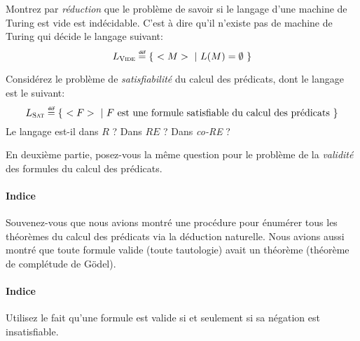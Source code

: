 \documentclass[12pt,french,a4paper]{article}
\newcommand\eqdef{\mathrel{\overset{\makebox[0pt]{\mbox{\normalfont\tiny\sffamily déf}}}{=}}}
\begin{document}
\begin{question}
Montrez par \textit{réduction} que le problème de savoir si le langage d'une machine de Turing est vide est indécidable.
C'est à dire qu'il n'existe pas de machine de Turing qui décide le langage suivant:
\[
L_{\textsc{Vide}} \eqdef \{\ <M>\ |\ L(M) = \emptyset\ \}
\]
\end{question}

\vspace{2cm}

\begin{question}
Considérez le problème de \textit{satisfiabilité} du calcul des prédicats, dont le langage est le suivant:
\[
L_\textsc{Sat} \eqdef \{\ <F>\ |\ F\text{ est une formule satisfiable du calcul des prédicats}\ \}
\]
Le langage est-il dans $R$ ? Dans $RE$ ? Dans \textit{co-RE} ?

En deuxième partie, posez-vous la même question pour le problème de la \textit{validité} des formules du calcul des prédicats.

\paragraph{Indice} Souvenez-vous que nous avions montré une procédure pour énumérer tous les théorèmes du calcul des prédicats via la déduction naturelle. Nous avions aussi montré que toute formule valide (toute tautologie) avait un théorème (théorème de complétude de Gödel).

\paragraph{Indice} Utilisez le fait qu'une formule est valide si et seulement si sa négation est insatisfiable.
\end{question}
\end{document}
